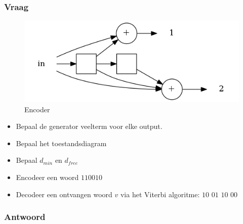 \documentclass[main.tex]{subfiles}
\begin{document}
\subsubsection*{Vraag}
\begin{figure}[H]
  \centering
  \includegraphics[scale=.5]{assets/conv}
  \caption{Encoder}
\end{figure}
\begin{itemize}
\item Bepaal de generator veelterm voor elke output.
\item Bepaal het toestandsdiagram
\item Bepaal $d_{min}$ en $d_{free}$
\item Encodeer een woord $110010$
\item Decodeer een ontvangen woord $v$ via het Viterbi algoritme: $10$ $01$ $10$ $00$
\end{itemize}

\subsubsection*{Antwoord}
\end{document}
